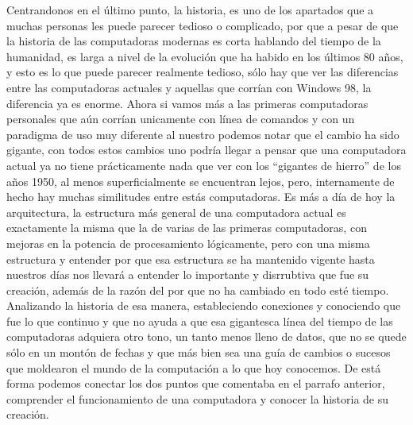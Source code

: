 \documentclass[letterpaper,12pt,oneside]{book}
\begin{document}
	
	Centrandonos en el último punto, la historia, es uno de los apartados que a muchas personas les puede parecer tedioso o complicado, 
	por que a pesar de que la historia de las computadoras modernas es corta hablando del tiempo
	de la humanidad, es larga a nivel de la evolución que ha habido en los últimos 80 años, y esto es lo que puede parecer realmente tedioso, sólo hay que ver las diferencias entre
	las computadoras actuales y aquellas que corrían con Windows 98, la diferencia ya es enorme. Ahora si vamos más  a las primeras computadoras personales
	que aún corrían unicamente con línea de comandos y con un paradigma de uso muy diferente al nuestro podemos notar que el cambio ha sido gigante, con todos estos
	cambios uno podría llegar a pensar que una computadora actual ya no tiene prácticamente nada que ver con los ``gigantes de hierro'' de los años 1950, 
	al menos superficialmente se encuentran lejos, pero, internamente de hecho hay muchas similitudes entre estás computadoras. Es más a día de hoy la arquitectura, la estructura
	más general de una computadora actual es exactamente la misma que la de varias de las primeras computadoras, con mejoras en la potencia de
	procesamiento lógicamente, pero con una misma estructura y entender por que esa estructura se ha mantenido vigente hasta nuestros días nos
	llevará a entender lo importante y disrrubtiva que fue su creación, además de la razón del por que no ha cambiado en todo esté tiempo. Analizando la historia de esa manera, estableciendo conexiones y conociendo que fue lo que continuo
	y que no ayuda a que esa gigantesca línea del tiempo de las computadoras adquiera otro tono, un tanto menos lleno de datos, que no se quede
	sólo en un montón de fechas y que más bien sea una guía de cambios o sucesos que moldearon el mundo de la computación a lo que hoy conocemos. De está forma podemos conectar los dos puntos que comentaba en el parrafo anterior,
	comprender el funcionamiento de una computadora y conocer la historia de su creación.
	
\end{document}
